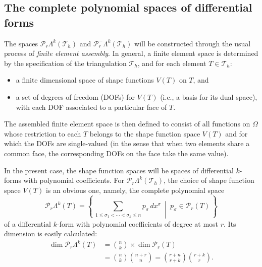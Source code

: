 \subsection{{The complete polynomial spaces of differential forms}}\label{sec:complete-polynomial-forms}

{The spaces $\mathcal P_r\Lambda^k(\mathcal T_h)$ and $\mathcal P_r^-\Lambda^k(\mathcal T_h)$ will be constructed through the usual process of \emph{finite element assembly}. In general, a finite element space is determined by the specification of the triangulation $\mathcal T_h$, and for each element $T\in\mathcal T_h$:}
\begin{itemize}
\item{a finite dimensional space of shape functions $V(T)$ on $T$, and}
\item{a set of degrees of freedom (DOFs) for $V(T)$ (i.e., a basis for its dual space), with each DOF associated to a particular face of $T$.}
\end{itemize}

{The assembled finite element space is then defined to consist of all functions on $\Omega$ whose restriction to each $T$ belongs to the shape function space $V(T)$ and for which the DOFs are single-valued (in the sense that when two elements share a common face, the corresponding DOFs on the face take the same value).}

{In the present case, the shape function spaces will be spaces of differential $k$-forms with polynomial coefficients. For $\mathcal P_r\Lambda^k(\mathcal T_h)$, the choice of shape function space $V(T)$ is an obvious one, namely, the complete polynomial space}
\[
\mathcal P_r\Lambda^k(T)=\left\{\,\sum_{1\leq\sigma_1<\cdots<\sigma_k\leq n}p_\sigma\,dx^\sigma\ \middle|\ p_\sigma\in\mathcal P_r(T)\,\right\}
\]
{of a differential $k$-form with polynomial coefficients of degree at most $r$. Its dimension is easily calculated:}
\begin{equation}\label{eq:complete-polynomial-form-dimension}
\begin{aligned}
\dim\mathcal P_r\Lambda^k(T)&=\binom nk\times\dim\mathcal P_r(T)\\
&=\binom nk\binom{n+r}n=\binom{r+n}{r+k}\binom{r+k}r.
\end{aligned}
\end{equation}

